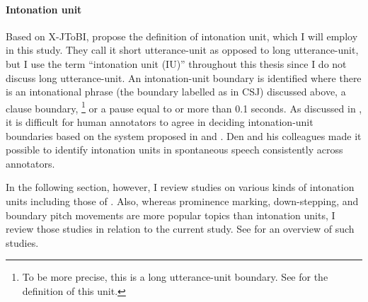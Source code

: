 \paragraph{Intonation unit}

Based on X-JToBI,
 propose the definition of intonation unit,
which I will employ in this study.
They call it short utterance-unit as opposed to long utterance-unit,
but I use the term ``intonation unit (IU)'' throughout this thesis
since I do not discuss long utterance-unit.
An intonation-unit boundary is identified
where there is an intonational phrase (the boundary labelled as  in CSJ) discussed above,
a clause boundary,%
	\footnote{
	To be more precise, this is a long utterance-unit boundary.
	See  for the definition of this unit.
	}
or
a pause equal to or more than 0.1 seconds.
As discussed in ,
it is difficult for human annotators to agree in deciding intonation-unit boundaries based on the system proposed in  and .
Den and his colleagues made it possible to identify intonation units in spontaneous speech consistently across annotators.

In the following section, however,
I review studies on various kinds of intonation units including those of .
Also, whereas prominence marking, down-stepping, and boundary pitch movements are more popular topics than intonation units,
I review those studies in relation to the current study.
See  for an overview of such studies.


%
%
%
%





